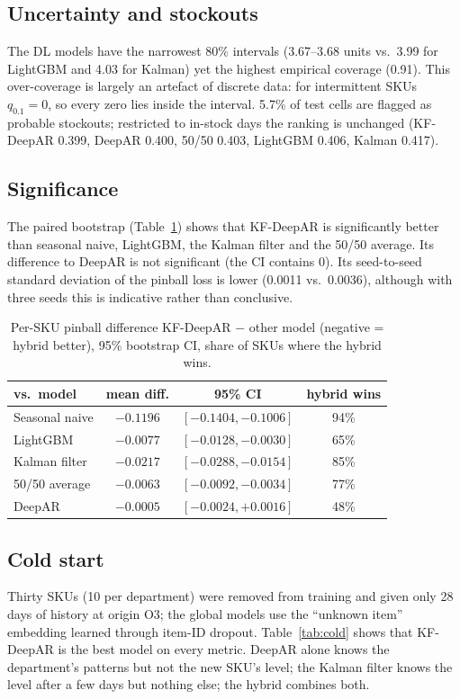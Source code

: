 \documentclass[conference]{IEEEtran}
\begin{document}
\subsection{Uncertainty and stockouts}
The DL models have the narrowest 80\% intervals (3.67--3.68 units vs.\ 3.99 for LightGBM and 4.03 for Kalman) yet the highest empirical coverage
(0.91). This over-coverage is largely an artefact of discrete data: for intermittent SKUs $q_{0.1}=0$, so every zero lies inside the interval.
5.7\% of test cells are flagged as probable stockouts; restricted to in-stock days the ranking is unchanged (KF-DeepAR 0.399, DeepAR 0.400,
50/50 0.403, LightGBM 0.406, Kalman 0.417).

\subsection{Significance}
The paired bootstrap (Table~\ref{tab:sig}) shows that KF-DeepAR is significantly better than seasonal naive, LightGBM, the Kalman filter and the
50/50 average. Its difference to DeepAR is not significant (the CI contains 0). Its seed-to-seed standard deviation of the pinball loss is lower
(0.0011 vs.\ 0.0036), although with three seeds this is indicative rather than conclusive.

\begin{table}[t]
\centering
\caption{Per-SKU pinball difference KF-DeepAR $-$ other model (negative = hybrid better), 95\% bootstrap CI, share of SKUs where the hybrid wins.}
\label{tab:sig}
\begin{tabular}{lccc}
\toprule
vs.\ model & mean diff. & 95\% CI & hybrid wins\\
\midrule
Seasonal naive & $-0.1196$ & $[-0.1404,-0.1006]$ & 94\%\\
LightGBM & $-0.0077$ & $[-0.0128,-0.0030]$ & 65\%\\
Kalman filter & $-0.0217$ & $[-0.0288,-0.0154]$ & 85\%\\
50/50 average & $-0.0063$ & $[-0.0092,-0.0034]$ & 77\%\\
DeepAR & $-0.0005$ & $[-0.0024,+0.0016]$ & 48\%\\
\bottomrule
\end{tabular}
\end{table}

\subsection{Cold start}
Thirty SKUs (10 per department) were removed from training and given only 28 days of history at origin O3; the global models use the
``unknown item'' embedding learned through item-ID dropout. Table~\ref{tab:cold} shows that KF-DeepAR is the best model on every metric.
DeepAR alone knows the department's patterns but not the new SKU's level; the Kalman filter knows the level after a few days but nothing else;
the hybrid combines both.
\end{document}
